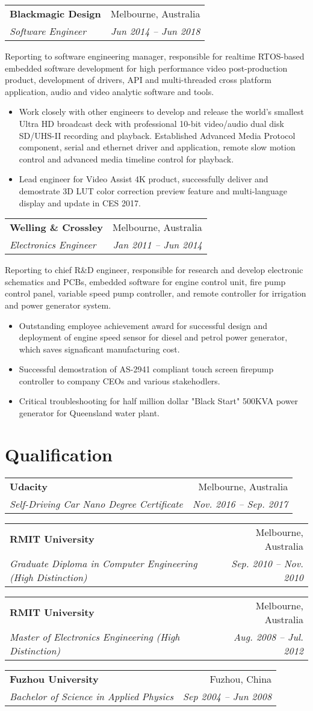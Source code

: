 \documentclass[letterpaper,11pt]{article}
\makeatletter
\newcommand{\resumeItemNoBullet}[4]{
  \vspace{-1pt}
    \begin{tabular*}{0.97\textwidth}{l@{\extracolsep{\fill}}r}
      \textbf{#1} & #2 \\
      \textit{\small#3} & \textit{\small #4} \\
    \end{tabular*}\vspace{-7pt}
}
\newcommand{\resumeSubHeadingListStart}{\begin{itemize}[leftmargin=*]}
\newcommand{\resumeSubHeadingListEnd}{\end{itemize}}
\makeatother
\begin{document}
\resumeItemNoBullet
{Blackmagic Design}{Melbourne, Australia}
{Software Engineer}{Jun 2014 -- Jun 2018}

\vspace{10pt}
{Reporting to software engineering manager, responsible for realtime RTOS-based embedded software development for high performance video post-production product, development of drivers, API and multi-threaded cross platform application, audio and video analytic software and tools.}
  \resumeSubHeadingListStart
    \item Work closely with other engineers to develop and release the world's smallest Ultra HD broadcast deck with professional 10-bit video/audio dual disk SD/UHS-II recording and playback.
    Established Advanced Media Protocol component, serial and ethernet driver and application, remote slow motion control and advanced media timeline control for playback.

    \item Lead engineer for Video Assist 4K product, successfully deliver and demostrate 3D LUT color correction preview feature and multi-language display and update in CES 2017. 
  \resumeSubHeadingListEnd

\resumeItemNoBullet
{Welling \& Crossley}{Melbourne, Australia}
{Electronics Engineer}{Jan 2011 -- Jun 2014}

\vspace{10pt}
{ Reporting to chief R\&D engineer, responsible for research and develop electronic schematics and PCBs, embedded software for engine control unit, fire pump control panel, variable speed pump controller, and remote controller for irrigation and power generator system. }
  \resumeSubHeadingListStart
    \item Outstanding employee achievement award for successful design and deployment of engine speed sensor for diesel and petrol power generator, which saves signaficant manufacturing cost. 
    \item Successful demostration of AS-2941 compliant touch screen firepump controller to company CEOs and various stakehodlers.
    \item Critical troubleshooting for half million dollar "Black Start" 500KVA power generator for Queensland water plant.
  \resumeSubHeadingListEnd

\section{Qualification}
\resumeItemNoBullet
    {Udacity}{Melbourne, Australia}
    {Self-Driving Car Nano Degree Certificate}{Nov. 2016 -- Sep. 2017}
\vspace{10pt}
\resumeItemNoBullet
    {RMIT University}{Melbourne, Australia}
    {Graduate Diploma in Computer Engineering (High Distinction)}{Sep. 2010 -- Nov. 2010}
\vspace{10pt}
\resumeItemNoBullet
    {RMIT University}{Melbourne, Australia}
    {Master of Electronics Engineering (High Distinction)}{Aug. 2008 -- Jul. 2012}
\vspace{10pt}
\resumeItemNoBullet
    {Fuzhou University}{Fuzhou, China}
    {Bachelor of Science in Applied Physics}{Sep 2004 -- Jun 2008}
\end{document}

